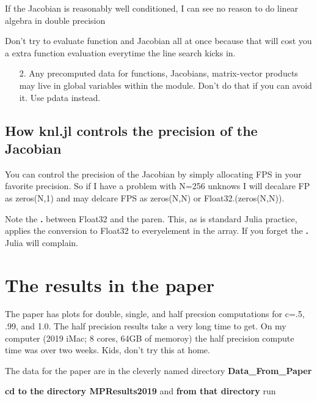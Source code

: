 \documentclass[11pt]{article}
\begin{document}
If the Jacobian is reasonably well conditioned, I can see no reason to do linear algebra in double precision

Don't try to evaluate function and Jacobian all at once because  that will cost you a extra function evaluation everytime the line search kicks in.

\begin{itemize}
\item[2. ] Any precomputed data for functions, Jacobians, matrix-vector products may live in global variables within the module. Don't do that if you can avoid it. Use pdata instead.

\end{itemize}


    

    \hypertarget{how-knl.jl-controls-the-precision-of-the-jacobian}{%
\subsection{How knl.jl controls the precision of the
Jacobian}\label{how-knl.jl-controls-the-precision-of-the-jacobian}}

You can control the precision of the Jacobian by simply allocating FPS
in your favorite precision. So if I have a problem with N=256 unknows I
will decalare FP as zeros(N,1) and may delcare FPS as zeros(N,N) or
Float32.(zeros(N,N)).

Note the \textbf{.} between Float32 and the paren. This, as is standard
Julia practice, applies the conversion to Float32 to everyelement in the
array. If you forget the \textbf{.} Julia will complain.

    \hypertarget{the-results-in-the-paper}{%
\section{The results in the paper}\label{the-results-in-the-paper}}

The paper has plots for double, single, and half precsion computations
for c=.5, .99, and 1.0. The half precision results take a very long time
to get. On my computer (2019 iMac; 8 cores, 64GB of memoroy) the half
precision compute time was over two weeks. Kids, don't try this at home.

The data for the paper are in the cleverly named directory
\textbf{Data\_From\_Paper}

\textbf{cd to the directory MPResults2019} and \textbf{from that
directory} run
\end{document}
